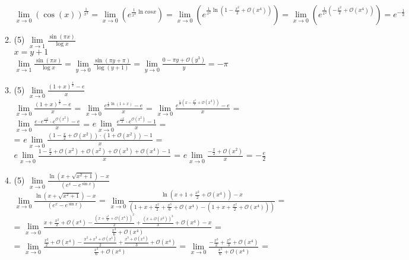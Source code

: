 \documentclass[a4paper]{article}
\begin{document}
\begin{enumerate}
\begin{enumerate}
        $\lim\limits_{x\to 0}(\cos(x))^{\frac{1}{x^2}} = \lim\limits_{x\to 0}(e^{\frac{1}{x^2}\ln cosx}) = \lim\limits_{x\to 0}(e^{\frac{1}{x^2}\ln (1 - \frac{x^2}{2} + \mathcal O(x^4))}) = \lim\limits_{x\to 0}(e^{\frac{1}{x^2}(-\frac{x^2}{2} + \mathcal O(x^4))}) = e^{-\frac{1}{2}}$
        \item (5) $\lim\limits_{x\to 1}\frac{\sin(\pi x)}{\log x}$\\
        $x = y + 1$\\
        $\lim\limits_{x\to 1}\frac{\sin(\pi x)}{\log x} = \lim\limits_{y\to 0}\frac{\sin(\pi y + \pi)}{\log (y + 1)} = \lim\limits_{y\to 0} \frac{0 - \pi y + \mathcal O(y^3)}{y} = -\pi$
        \item (5) $\lim\limits_{x\to 0}\frac{(1 + x)^{\frac{1}{x}} - e}{x}$\\
        $\lim\limits_{x\to 0}\frac{(1 + x)^{\frac{1}{x}} - e}{x}$ = $\lim\limits_{x\to 0}\frac{e^{\frac{1}{x}\ln(1 + x)} - e}{x}$ = $\lim\limits_{x\to 0}\frac{e^{\frac{1}{x}(x - \frac{x^2}{2} + \mathcal O(x^3))} - e}{x}$ = $\lim\limits_{x\to 0}\frac{e\cdot e^\frac{-x}{2}\cdot e^{\mathcal O(x^2)} - e}{x}$ = $e\lim\limits_{x\to 0}\frac{e^\frac{-x}{2}\cdot e^{\mathcal O(x^2)} - 1}{x}$ =\\= $e\lim\limits_{x\to 0}\frac{(1 - \frac{x}{2} + \mathcal O(x^2))\cdot (1 + \mathcal O(x^2)) - 1}{x}$ = $e\lim\limits_{x\to 0}\frac{1 - \frac{x}{2} + \mathcal O(x^2) + \mathcal O(x^2) + \mathcal O(x^3) + \mathcal O(x^4) - 1}{x}$ = $e\lim\limits_{x\to 0}\frac{-\frac{x}{2} + \mathcal O(x^2)}{x}$ = $-\frac{e}{2}$
        \item (5) $\lim\limits_{x\to 0}\frac{\ln (x+\sqrt{x^2+1})-x}{(e^x-e^{\sin x})}$\\
        $\lim\limits_{x\to 0}\frac{\ln (x+\sqrt{x^2+1})-x}{(e^x-e^{\sin x})}$ = 
        $\lim\limits_{x\to 0}\frac{\ln (x + 1 + \frac{x^2}{2} + \mathcal O(x^4))-x}{(1 + x + \frac{x^2}{2} + \frac{x^3}{6} + \mathcal O(x^4) - (1 + x + \frac{x^2}{2} + \mathcal O(x^4)))}$ =\\=
         $\lim\limits_{x\to 0}\frac{x + \frac{x^2}{2} + \mathcal O(x^4)  - \frac{(x + \frac{x^2}{2} + \mathcal O(x^4))^2}{2} + \frac{(x + \mathcal O(x^2))^3}{3} + \mathcal O(x^4)-x}{\frac{x^3}{6} + \mathcal O(x^4)}$ =\\=
         $\lim\limits_{x\to 0}\frac{\frac{x^2}{2} + \mathcal O(x^4)  - \frac{x^2 + x^3 + \mathcal O(x^4)}{2} + \frac{x^3 + \mathcal O(x^4)}{3} + \mathcal O(x^4)}{\frac{x^3}{6} + \mathcal O(x^4)}$ = 
         $\lim\limits_{x\to 0}\frac{-\frac{x^3}{2} + \frac{x^3}{3} + \mathcal O(x^4)}{\frac{x^3}{6} + \mathcal O(x^4)}$ = 

\end{enumerate}
\end{enumerate}
\end{document}
